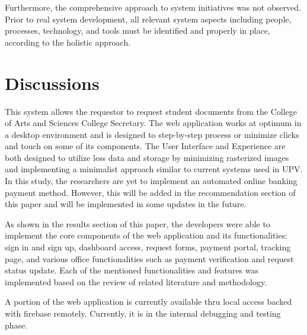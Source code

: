 Furthermore, the comprehensive approach to system initiatives was not observed. Prior to real system development, all relevant system aspects including people, processes, technology, and tools must be identified and properly in place, according to the holistic approach.



\section{Discussions}

This system allows the requestor to request student documents from the College of Arts and Sciences College Secretary. The web application works at optimum in a desktop environment and is designed to step-by-step process or minimize clicks and touch on some of its components. The User Interface and Experience are both designed to utilize less data and storage by minimizing rasterized images and implementing a minimalist approach similar to current systems used in UPV. In this study, the researchers are yet to implement an automated online banking payment method. However, this will be added in the recommendation section of this paper and will be implemented in some updates in the future.

As shown in the results section of this paper, the developers were able to implement the core components of the web application and its functionalities: sign in and sign up, dashboard access, request forms, payment portal, tracking page, and various office functionalities such as payment verification and request status update. Each of the mentioned functionalities and features was implemented based on the review of related literature and methodology. 

A portion of the web application is currently available thru local access backed with firebase remotely. Currently, it is in the internal debugging and testing phase.